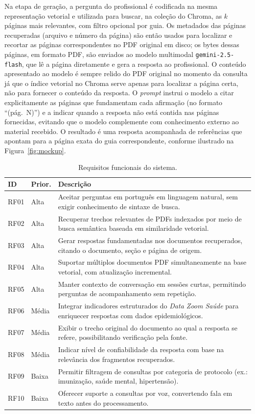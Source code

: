 \documentclass[conference,a4paper]{IEEEtran}
\begin{document}
Na etapa de geração, a pergunta do profissional é codificada na mesma representação vetorial e utilizada para buscar, na coleção do Chroma, as $k$ páginas mais relevantes, com filtro opcional por guia. Os metadados das páginas recuperadas (arquivo e número da página) são então usados para localizar e recortar as páginas correspondentes no PDF original em disco; os bytes dessas páginas, em formato PDF, são enviados ao modelo multimodal \texttt{gemini-2.5-flash}, que lê a página diretamente e gera a resposta ao profissional. O conteúdo apresentado ao modelo é sempre relido do PDF original no momento da consulta já que o índice vetorial no Chroma serve apenas para localizar a página certa, não para fornecer o conteúdo da resposta. O \textit{prompt} instrui o modelo a citar explicitamente as páginas que fundamentam cada afirmação (no formato ``(pág.~N)'') e a indicar quando a resposta não está contida nas páginas fornecidas, evitando que o modelo complemente com conhecimento externo ao material recebido. O resultado é uma resposta acompanhada de referências que apontam para a página exata do guia correspondente, conforme ilustrado na Figura~\ref{fig:mockup}.

\begin{table}[!t]
  \centering
  \caption{Requisitos funcionais do sistema.}
  \label{tab:req-func}
  \begin{tabularx}{\textwidth}{llX}
    \toprule
    \textbf{ID} & \textbf{Prior.} & \textbf{Descrição} \\
    \midrule
    RF01 & Alta  & Aceitar perguntas em português em linguagem natural, sem exigir conhecimento de sintaxe de busca. \\
    RF02 & Alta  & Recuperar trechos relevantes de PDFs indexados por meio de busca semântica baseada em similaridade vetorial. \\
    RF03 & Alta  & Gerar respostas fundamentadas nos documentos recuperados, citando o documento, seção e página de origem. \\
    RF04 & Alta  & Suportar múltiplos documentos PDF simultaneamente na base vetorial, com atualização incremental. \\
    RF05 & Alta  & Manter contexto de conversação em sessões curtas, permitindo perguntas de acompanhamento sem repetição. \\
    RF06 & Média & Integrar indicadores estruturados do \textit{Data Zoom Saúde} para enriquecer respostas com dados epidemiológicos. \\
    RF07 & Média & Exibir o trecho original do documento ao qual a resposta se refere, possibilitando verificação pela fonte. \\
    RF08 & Média & Indicar nível de confiabilidade da resposta com base na relevância dos fragmentos recuperados. \\
    RF09 & Baixa & Permitir filtragem de consultas por categoria de protocolo (ex.: imunização, saúde mental, hipertensão). \\
    RF10 & Baixa & Oferecer suporte a consultas por voz, convertendo fala em texto antes do processamento. \\
    \bottomrule
  \end{tabularx}
\end{table}
\end{document}
